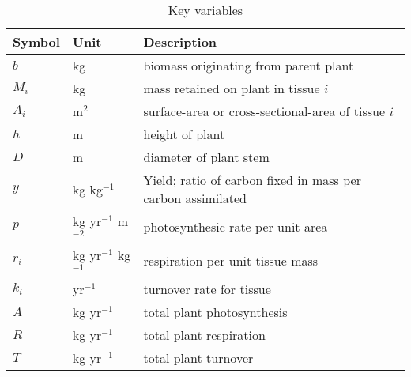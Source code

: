 \documentclass[a4paper,11pt]{article}
\begin{document}
\begin{table}[ht]
 \caption{Key variables
}
\centering

{\footnotesize  %
 \begin{doublespace}
  \begin{tabular}{p{2cm}p{2cm}p{7cm}}
  \hline
  Symbol & Unit & Description \\
  \hline

  $b$   & kg  & biomass originating from parent plant\\
  $M_i$ & kg  & mass retained on plant in tissue $i$\\
  $A_i$ & m$^2$  & surface-area or cross-sectional-area of tissue $i$\\
  $h$   & m  & height of plant\\
  $D$   & m  & diameter of plant stem\\

  $y$ & kg kg$^{-1}$ & Yield; ratio of carbon fixed in mass per carbon assimilated \\
  $p$ & kg yr$^{-1}$ m$^{-2}$  & photosynthesic rate per unit area \\
  $r_i$ & kg yr$^{-1}$ kg$^{-1}$  & respiration per unit tissue mass \\
  $k_i$ & yr$^{-1}$ & turnover rate for tissue \\
  $A$ & kg yr$^{-1}$ & total plant photosynthesis \\
  $R$ & kg yr$^{-1}$ & total plant respiration \\
  $T$ & kg yr$^{-1}$ & total plant turnover \\
  \hline
  \end{tabular}
\end{doublespace}}
\label{tab:definitions}
\end{table}

\newpage
\end{document}
